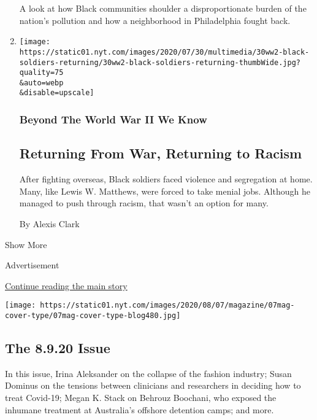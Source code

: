 \begin{enumerate}
  A look at how Black communities shoulder a disproportionate burden of
  the nation's pollution and how a neighborhood in Philadelphia fought
  back.
\item
  \href{/2020/07/30/magazine/black-soldiers-wwii-racism.html}{}

  \texttt{[image: https://static01.nyt.com/images/2020/07/30/multimedia/30ww2-black-soldiers-returning/30ww2-black-soldiers-returning-thumbWide.jpg?quality=75\\\&auto=webp\\\&disable=upscale]}

  \hypertarget{beyond-the-world-war-ii-we-know-2}{%
  \subsubsection{Beyond The World War II We
  Know}\label{beyond-the-world-war-ii-we-know-2}}

  \hypertarget{returning-from-war-returning-to-racism}{%
  \subsection{Returning From War, Returning to
  Racism}\label{returning-from-war-returning-to-racism}}

  After fighting overseas, Black soldiers faced violence and segregation
  at home. Many, like Lewis W. Matthews, were forced to take menial
  jobs. Although he managed to push through racism, that wasn't an
  option for many.

  By Alexis Clark
\end{enumerate}

Show More

Advertisement

\protect\hyperlink{after-mid2}{Continue reading the main story}

\href{https://www.nytimes.com/issue/magazine/2020/08/07/the-8920-issue}{}

\texttt{[image: https://static01.nyt.com/images/2020/08/07/magazine/07mag-cover-type/07mag-cover-type-blog480.jpg]}

\href{https://www.nytimes.com/issue/magazine/2020/08/07/the-8920-issue}{}

\hypertarget{the-8920-issue}{%
\subsection{The 8.9.20 Issue}\label{the-8920-issue}}

In this issue, Irina Aleksander on the collapse of the fashion industry;
Susan Dominus on the tensions between clinicians and researchers in
deciding how to treat Covid-19; Megan K. Stack on Behrouz Boochani, who
exposed the inhumane treatment at Australia's offshore detention camps;
and more.

